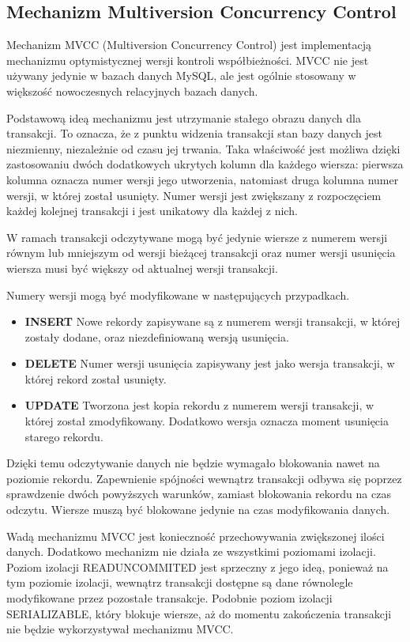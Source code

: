 \subsection{Mechanizm Multiversion Concurrency Control}
Mechanizm MVCC (Multiversion Concurrency Control) jest implementacją mechanizmu optymistycznej wersji kontroli współbieżności. MVCC nie jest używany jedynie w bazach danych MySQL, ale jest ogólnie stosowany w większość nowoczesnych relacyjnych bazach danych.

Podstawową ideą mechanizmu jest utrzymanie stałego obrazu danych dla transakcji. To oznacza, że z punktu widzenia transakcji stan bazy danych jest niezmienny, niezależnie od czasu jej trwania. Taka właściwość jest możliwa dzięki zastosowaniu dwóch dodatkowych ukrytych kolumn dla każdego wiersza: pierwsza kolumna oznacza numer wersji jego utworzenia, natomiast druga kolumna numer wersji, w której został usunięty. Numer wersji jest zwiększany z rozpoczęciem każdej kolejnej transakcji i jest unikatowy dla każdej z nich. 

W ramach transakcji odczytywane mogą być jedynie wiersze z numerem wersji równym lub mniejszym od wersji bieżącej transakcji oraz numer wersji usunięcia wiersza musi być większy od aktualnej wersji transakcji.

Numery wersji mogą być modyfikowane w następujących przypadkach.
\begin{itemize}
	\item \textbf{INSERT} Nowe rekordy zapisywane są z numerem wersji transakcji, w której zostały dodane, oraz niezdefiniowaną wersją usunięcia.
	\item \textbf{DELETE} Numer wersji usunięcia zapisywany jest jako wersja transakcji, w której rekord został usunięty.
	\item \textbf{UPDATE} Tworzona jest kopia rekordu z numerem wersji transakcji, w której został zmodyfikowany. Dodatkowo wersja oznacza moment usunięcia starego rekordu.
\end{itemize}

Dzięki temu odczytywanie danych nie będzie wymagało blokowania nawet na poziomie rekordu. Zapewnienie spójności wewnątrz transakcji odbywa się poprzez sprawdzenie dwóch powyższych warunków, zamiast blokowania rekordu na czas odczytu. Wiersze muszą być blokowane jedynie na czas modyfikowania danych. 

Wadą mechanizmu MVCC jest konieczność przechowywania zwiększonej ilości danych. Dodatkowo mechanizm nie działa ze wszystkimi poziomami izolacji. Poziom izolacji READ\textunderscore UNCOMMITED jest sprzeczny z jego ideą, ponieważ na tym poziomie izolacji, wewnątrz transakcji dostępne są dane równolegle modyfikowane przez pozostałe transakcje. Podobnie poziom izolacji SERIALIZABLE, który blokuje wiersze, aż do momentu zakończenia transakcji nie będzie wykorzystywał mechanizmu MVCC.
